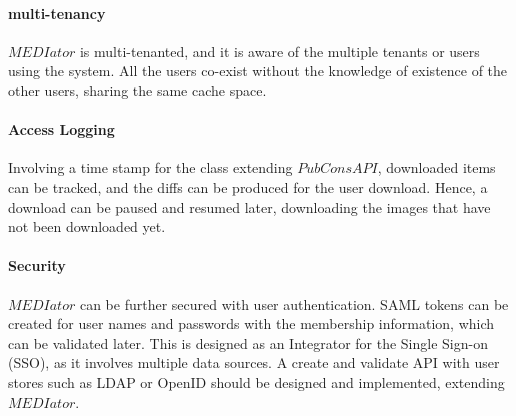 \documentclass[conference]{IEEEtran}
\begin{document}
\paragraph*{multi-tenancy}
$MEDIator$ is multi-tenanted, and it is aware of the multiple tenants or users using the system. All the users co-exist without the knowledge of existence of the other users, sharing the same cache space. 

\paragraph*{Access Logging}
Involving a time stamp for the class extending $PubConsAPI$, downloaded items can be tracked, and the diffs can be produced for the user download. Hence, a download can be paused and resumed later, downloading the images that have not been downloaded yet.

\paragraph*{Security}
$MEDIator$ can be further secured with user authentication. SAML tokens can be created for user names and passwords with the membership information, which can be validated later. This is designed as an Integrator for the Single Sign-on (SSO), as it involves multiple data sources. A create and validate API with user stores such as LDAP or OpenID should be designed and implemented, extending $MEDIator$.
\end{document}
